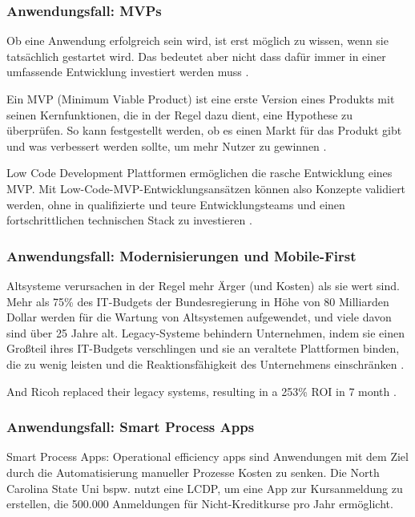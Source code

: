 \documentclass[12pt]{article} %
\begin{document}
	\subsubsection{Anwendungsfall: MVPs} \label{MVP}
	Ob eine Anwendung erfolgreich sein wird, ist erst möglich zu wissen, wenn sie tatsächlich gestartet wird. Das bedeutet aber nicht dass dafür immer in einer umfassende Entwicklung investiert werden muss \cite{OleksiiGlib.2022}.
	
	Ein MVP (Minimum Viable Product) ist eine erste Version eines Produkts mit seinen Kernfunktionen, die in der Regel dazu dient, eine Hypothese zu überprüfen. So kann festgestellt werden, ob es einen Markt für das Produkt gibt und was verbessert werden sollte, um mehr Nutzer zu gewinnen \cite{OleksiiGlib.2022}.
	
	Low Code Development Plattformen ermöglichen die rasche Entwicklung eines MVP. Mit Low-Code-MVP-Entwicklungsansätzen können also Konzepte validiert werden, ohne in qualifizierte und teure Entwicklungsteams und einen fortschrittlichen technischen Stack zu investieren \cite{OleksiiGlib.2022}.
	
	\subsubsection{Anwendungsfall: Modernisierungen und Mobile-First}	
	Altsysteme verursachen in der Regel mehr Ärger (und Kosten) als sie wert sind. Mehr als 75\% des IT-Budgets der Bundesregierung in Höhe von 80 Milliarden Dollar werden für die Wartung von Altsystemen aufgewendet, und viele davon sind über 25 Jahre alt. Legacy-Systeme behindern Unternehmen, indem sie einen Großteil ihres IT-Budgets verschlingen und sie an veraltete Plattformen binden, die zu wenig leisten und die Reaktionsfähigkeit des Unternehmens einschränken \cite{KevinShuler.2023}.
	
	
	And Ricoh replaced their legacy systems, resulting in a 253\% ROI in 7 month \cite{KevinShuler.2023}.
	
	\subsubsection{Anwendungsfall: Smart Process Apps}
	Smart Process Apps: Operational efficiency apps sind Anwendungen mit dem Ziel durch die Automatisierung manueller Prozesse Kosten zu senken. Die North Carolina State Uni bspw. nutzt eine LCDP, um eine App zur Kursanmeldung zu erstellen, die 500.000 Anmeldungen für Nicht-Kreditkurse pro Jahr ermöglicht.
	
\end{document}
